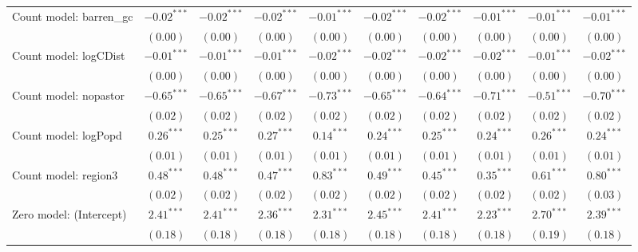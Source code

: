 \begin{center}
\begin{longtable}{l c c c c c c c c c}
Count model: barren\_gc        & $-0.02^{***}$  & $-0.02^{***}$  & $-0.02^{***}$ & $-0.01^{***}$ & $-0.02^{***}$ & $-0.02^{***}$   & $-0.01^{***}$ & $-0.01^{***}$ & $-0.01^{***}$   \\
                               & $(0.00)$       & $(0.00)$       & $(0.00)$      & $(0.00)$      & $(0.00)$      & $(0.00)$        & $(0.00)$      & $(0.00)$      & $(0.00)$        \\
Count model: logCDist          & $-0.01^{***}$  & $-0.01^{***}$  & $-0.01^{***}$ & $-0.02^{***}$ & $-0.02^{***}$ & $-0.02^{***}$   & $-0.02^{***}$ & $-0.01^{***}$ & $-0.02^{***}$   \\
                               & $(0.00)$       & $(0.00)$       & $(0.00)$      & $(0.00)$      & $(0.00)$      & $(0.00)$        & $(0.00)$      & $(0.00)$      & $(0.00)$        \\
Count model: nopastor          & $-0.65^{***}$  & $-0.65^{***}$  & $-0.67^{***}$ & $-0.73^{***}$ & $-0.65^{***}$ & $-0.64^{***}$   & $-0.71^{***}$ & $-0.51^{***}$ & $-0.70^{***}$   \\
                               & $(0.02)$       & $(0.02)$       & $(0.02)$      & $(0.02)$      & $(0.02)$      & $(0.02)$        & $(0.02)$      & $(0.02)$      & $(0.02)$        \\
Count model: logPopd           & $0.26^{***}$   & $0.25^{***}$   & $0.27^{***}$  & $0.14^{***}$  & $0.24^{***}$  & $0.25^{***}$    & $0.24^{***}$  & $0.26^{***}$  & $0.24^{***}$    \\
                               & $(0.01)$       & $(0.01)$       & $(0.01)$      & $(0.01)$      & $(0.01)$      & $(0.01)$        & $(0.01)$      & $(0.01)$      & $(0.01)$        \\
Count model: region3           & $0.48^{***}$   & $0.48^{***}$   & $0.47^{***}$  & $0.83^{***}$  & $0.49^{***}$  & $0.45^{***}$    & $0.35^{***}$  & $0.61^{***}$  & $0.80^{***}$    \\
                               & $(0.02)$       & $(0.02)$       & $(0.02)$      & $(0.02)$      & $(0.02)$      & $(0.02)$        & $(0.02)$      & $(0.02)$      & $(0.03)$        \\
Zero model: (Intercept)        & $2.41^{***}$   & $2.41^{***}$   & $2.36^{***}$  & $2.31^{***}$  & $2.45^{***}$  & $2.41^{***}$    & $2.23^{***}$  & $2.70^{***}$  & $2.39^{***}$    \\
                               & $(0.18)$       & $(0.18)$       & $(0.18)$      & $(0.18)$      & $(0.18)$      & $(0.18)$        & $(0.18)$      & $(0.19)$      & $(0.18)$        \\

\end{longtable}
\end{center}

